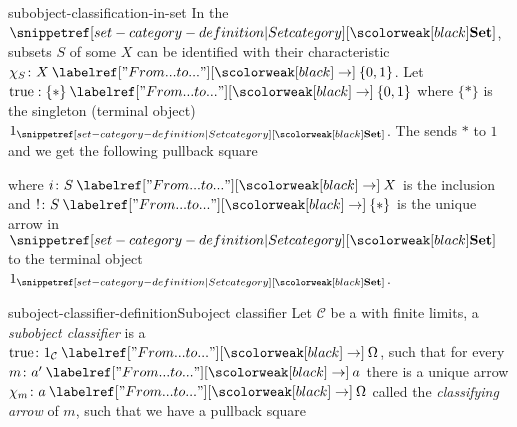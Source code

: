 \documentclass[preview]{standalone}
\begin{document}
\begin{snippet}{subobject-classification-in-set}
    In the \category \(\catset\), subsets \(S\)
    of some \set \(X\) can be identified with their characteristic
    \function[functions] \(\chi_S \colon X \fromto \{0,1\}\).
    Let \(\text{true}: \{\ast\} \fromto \{0,1\}\) where \(\{\ast\}\)
    is the singleton (terminal object) \(1_{\catset}\).
    The \function sends \(\ast\) to \(1\) and we get the following
    pullback square
    \begin{center}
    \end{center}
    where \(i\colon S \fromto X\) is the inclusion
    and \(! \colon S \fromto \{\ast\}\) is the unique arrow
    in \(\catset\) to the terminal object \(1_{\catset}\).
\end{snippet}


\begin{snippetdefinition}{suboject-classifier-definition}{Suboject classifier}
    Let \(\mathcal{C}\) be a \category with finite limits, a \emph{subobject classifier}
    is a \monomorphism \(\text{true}\colon 1_\mathcal{C} \fromto \Omega\),
    such that for every \monomorphism \(m \colon a' \fromto a\) there is a unique arrow
    \(\chi_m \colon a \fromto \Omega\) called the \emph{classifying arrow} of \(m\),
    such that we have a pullback square
    \begin{center}
    \end{center}
\end{snippetdefinition}
\end{document}
